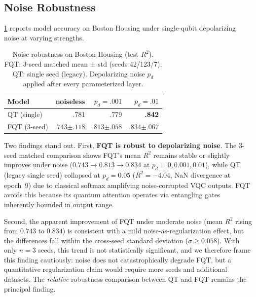 \documentclass[10pt,conference]{IEEEtran}
\begin{document}
\subsection{Noise Robustness}
\label{sec:results-noise}

\cref{tab:noise} reports model accuracy on Boston Housing under single-qubit depolarizing noise at varying strengths.

\begin{table}[t]
\centering
\caption{Noise robustness on Boston Housing (test $R^2$). FQT: 3-seed matched mean $\pm$ std (seeds 42/123/7); QT: single seed (legacy). Depolarizing noise $p_d$ applied after every parameterized layer.}
\label{tab:noise}
\small
\begin{tabular}{lrrr}
\toprule
Model & noiseless & $p_d{=}.001$ & $p_d{=}.01$ \\
\midrule
QT (single)  & .781 & .779 & \textbf{.842} \\
FQT (3-seed) & $.743{\scriptstyle\pm.118}$ & $.813{\scriptstyle\pm.058}$ & $\mathbf{.834}{\scriptstyle\pm.067}$ \\
\bottomrule
\end{tabular}
\vspace{-5pt}
\end{table}

Two findings stand out.
First, \textbf{FQT is robust to depolarizing noise}.
The 3-seed matched comparison shows FQT's mean $R^2$ remains stable or slightly improves under noise ($0.743 \!\to\! 0.813 \!\to\! 0.834$ at $p_d{=}0,0.001,0.01$), while QT (legacy single seed) collapsed at $p_d{=}0.05$ ($R^2{=}{-}4.04$, NaN divergence at epoch~9) due to classical softmax amplifying noise-corrupted VQC outputs.
FQT avoids this because its quantum attention operates via entangling gates inherently bounded in output range.

Second, the apparent improvement of FQT under moderate noise (mean $R^2$ rising from $0.743$ to $0.834$) is consistent with a mild noise-as-regularization effect, but the differences fall within the cross-seed standard deviation ($\sigma{\geq}0.058$).
With only $n{=}3$ seeds, this trend is not statistically significant, and we therefore frame this finding cautiously: noise does not catastrophically degrade FQT, but a quantitative regularization claim would require more seeds and additional datasets.
The \emph{relative} robustness comparison between QT and FQT remains the principal finding.

\end{document}
